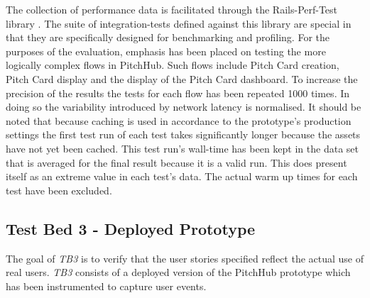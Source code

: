 The collection of performance data is facilitated through the Rails-Perf-Test library \cite{railsperftest:online}. The suite of integration-tests defined against this library are special in that they are specifically designed for benchmarking and profiling. For the purposes of the evaluation, emphasis has been placed on testing the more logically complex flows in PitchHub. Such flows include Pitch Card creation, Pitch Card display and the display of the Pitch Card dashboard. To increase the precision of the results the tests for each flow has been repeated 1000 times. In doing so the variability introduced by network latency is normalised. It should be noted that because caching is used in accordance to the prototype's production settings the first test run of each test takes significantly longer because the assets have not yet been cached. This test run's wall-time has been kept in the data set that is averaged for the final result because it is a valid run. This does present itself as an extreme value in each test's data. The actual warm up times for each test have been excluded.

\subsection{Test Bed 3 - Deployed Prototype}\label{SS:deployedPrototype}
The goal of \textit{TB3} is to verify that the user stories specified reflect the actual use of real users. \textit{TB3} consists of a deployed version of the PitchHub prototype which has been instrumented to capture user events.
